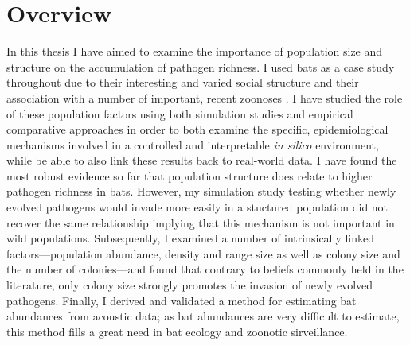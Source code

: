 
\section{Overview}

In this thesis I have aimed to examine the importance of population size and structure on the accumulation of pathogen richness.
I used bats as a case study throughout due to their interesting and varied social structure \cite{kerth2008causes} and their association with a number of important, recent zoonoses \cite{leroy2005fruit, field2001natural, halpin2011pteropid, li2005bats}.
I have studied the role of these population factors using both simulation studies and empirical comparative approaches in order to both examine the specific, epidemiological mechanisms involved in a controlled and interpretable \emph{in silico} environment, while be able to also link these results back to real-world data.
I have found the most robust evidence so far that population structure does relate to higher pathogen richness in bats.
However, my simulation study testing whether newly evolved pathogens would invade more easily in a stuctured population did not recover the same relationship implying that this mechanism is not important in wild populations.
Subsequently, I examined a number of intrinsically linked factors---population abundance, density and range size as well as colony size and the number of colonies---and found that contrary to beliefs commonly held in the literature, only colony size strongly promotes the invasion of newly evolved pathogens.
Finally, I derived and validated a method for estimating bat abundances from acoustic data; as bat abundances are very difficult to estimate, this method fills a great need in bat ecology and zoonotic sirveillance.




